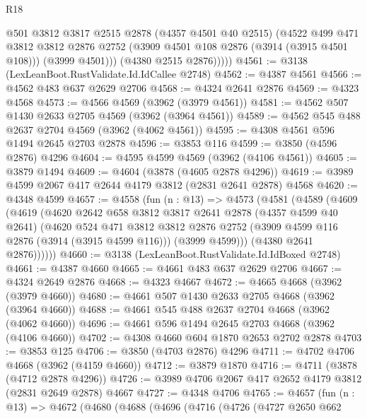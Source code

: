 \begin{lexlean}{R18}
\begin{coremodule}
              @501
              @3812
              @3817
              @2515
              @2878
              (@4357 @4501 @40 @2515)
              (@4522
                @499
                @471
                @3812
                @3812
                @2876
                @2752
                (@3909 @4501 @108 @2876 (@3914 (@3915 @4501 @108)))
                (@3999 @4501)))
            (@4380 @2515 @2876)))))
@4561 := @3138 (LexLeanBoot.RustValidate.Id.IdCallee @2748)
@4562 := @4387 @4561
@4566 := @4562 @483 @637 @2629 @2706
@4568 := @4324 @2641 @2876
@4569 := @4323 @4568
@4573 := @4566 @4569 (@3962 (@3979 @4561))
@4581 := @4562 @507 @1430 @2633 @2705 @4569 (@3962 (@3964 @4561))
@4589 := @4562 @545 @488 @2637 @2704 @4569 (@3962 (@4062 @4561))
@4595 := @4308 @4561 @596 @1494 @2645 @2703 @2878
@4596 := @3853 @116
@4599 := @3850 (@4596 @2876) @4296
@4604 := @4595 @4599 @4569 (@3962 (@4106 @4561))
@4605 := @3879 @1494
@4609 := @4604 (@3878 (@4605 @2878 @4296))
@4619 := @3989 @4599 @2067 @417 @2644 @4179 @3812 (@2831 @2641 @2878) @4568
@4620 := @4348 @4599
@4657 := @4558
    (fun (n : @13) =>
    @4573
      (@4581
        (@4589
          (@4609
            (@4619
              (@4620
                @2642
                @658
                @3812
                @3817
                @2641
                @2878
                (@4357 @4599 @40 @2641)
                (@4620
                  @524
                  @471
                  @3812
                  @3812
                  @2876
                  @2752
                  (@3909 @4599 @116 @2876 (@3914 (@3915 @4599 @116)))
                  (@3999 @4599)))
              (@4380 @2641 @2876))))))
@4660 := @3138 (LexLeanBoot.RustValidate.Id.IdBoxed @2748)
@4661 := @4387 @4660
@4665 := @4661 @483 @637 @2629 @2706
@4667 := @4324 @2649 @2876
@4668 := @4323 @4667
@4672 := @4665 @4668 (@3962 (@3979 @4660))
@4680 := @4661 @507 @1430 @2633 @2705 @4668 (@3962 (@3964 @4660))
@4688 := @4661 @545 @488 @2637 @2704 @4668 (@3962 (@4062 @4660))
@4696 := @4661 @596 @1494 @2645 @2703 @4668 (@3962 (@4106 @4660))
@4702 := @4308 @4660 @604 @1870 @2653 @2702 @2878
@4703 := @3853 @125
@4706 := @3850 (@4703 @2876) @4296
@4711 := @4702 @4706 @4668 (@3962 (@4159 @4660))
@4712 := @3879 @1870
@4716 := @4711 (@3878 (@4712 @2878 @4296))
@4726 := @3989 @4706 @2067 @417 @2652 @4179 @3812 (@2831 @2649 @2878) @4667
@4727 := @4348 @4706
@4765 := @4657
    (fun (n : @13) =>
    @4672
      (@4680
        (@4688
          (@4696
            (@4716
              (@4726
                (@4727
                  @2650
                  @662

\end{coremodule}
\end{lexlean}
